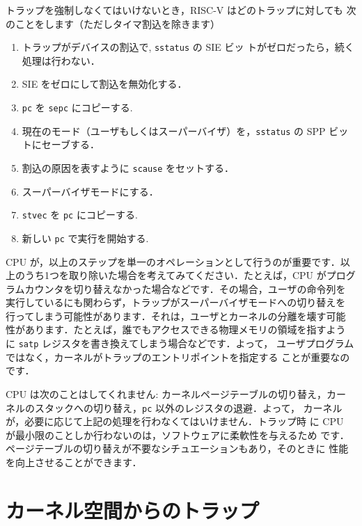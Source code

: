 トラップを強制しなくてはいけないとき，RISC-V はどのトラップに対しても
次のことをします（ただしタイマ割込を除きます）
\begin{enumerate}
\item トラップがデバイスの割込で, \texttt{sstatus} の SIE ビッ
  トがゼロだったら，続く処理は行わない．

\item SIE をゼロにして割込を無効化する．

\item \texttt{pc} を \texttt{sepc} にコピーする.

\item 現在のモード（ユーザもしくはスーパーバイザ）を，\texttt{sstatus} の SPP ビットにセーブする．

\item 割込の原因を表すように \texttt{scause} をセットする．

\item スーパーバイザモードにする．

\item \texttt{stvec} を \texttt{pc} にコピーする.

\item 新しい \texttt{pc} で実行を開始する.

\end{enumerate}

CPU が，以上のステップを単一のオペレーションとして行うのが重要です．以
上のうち1つを取り除いた場合を考えてみてください．たとえば，CPU がプログ
ラムカウンタを切り替えなかった場合などです．その場合，ユーザの命令列を
実行しているにも関わらず，トラップがスーパーバイザモードへの切り替えを
行ってしまう可能性があります．それは，ユーザとカーネルの分離を壊す可能
性があります．たとえば，誰でもアクセスできる物理メモリの領域を指すよう
に \texttt{satp} レジスタを書き換えてしまう場合などです．よって，
ユーザプログラムではなく，カーネルがトラップのエントリポイントを指定する
ことが重要なのです．

CPU は次のことはしてくれません: カーネルページテーブルの切り替え，カー
ネルのスタックへの切り替え，\texttt{pc} 以外のレジスタの退避．よって，
カーネルが，必要に応じて上記の処理を行わなくてはいけません．トラップ時
に CPU が最小限のことしか行わないのは，ソフトウェアに柔軟性を与えるため
です．ページテーブルの切り替えが不要なシチュエーションもあり，そのときに
性能を向上させることができます．

\section{カーネル空間からのトラップ}

